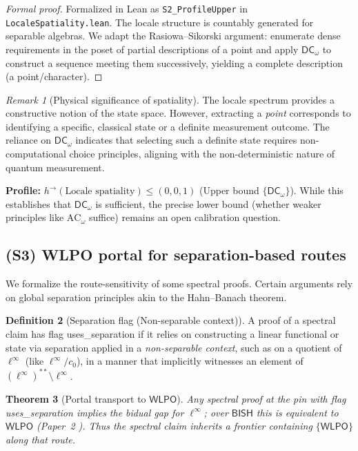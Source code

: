 \documentclass[11pt]{article}
\newcommand{\WLPO}{\mathsf{WLPO}}
\newcommand{\DCw}{\mathsf{DC}_{\omega}}
\newcommand{\lean}[1]{\texttt{#1}}
\newcommand{\leanok}{\text{\tiny [✓ Lean]}}
\theoremstyle{plain}
\newtheorem{theorem}{Theorem}[section]
\theoremstyle{definition}
\newtheorem{definition}[theorem]{Definition}
\theoremstyle{remark}
\newtheorem{remark}[theorem]{Remark}
\newcommand{\linf}{\ell^\infty}
\newcommand{\BISH}{\mathsf{BISH}}
\newcommand{\ACw}{\mathrm{AC}_\omega}
\begin{document}
\begin{proof}[Formal proof]
Formalized in Lean as \lean{S2\_ProfileUpper} in \texttt{LocaleSpatiality.lean}.
The locale structure is countably generated for separable algebras. We adapt the Rasiowa--Sikorski argument: enumerate dense requirements in the poset of partial descriptions of a point and apply $\DCw$ to construct a sequence meeting them successively, yielding a complete description (a point/character).
\end{proof}

\begin{remark}[Physical significance of spatiality]
The locale spectrum provides a constructive notion of the state space. However, extracting a \emph{point} corresponds to identifying a specific, classical state or a definite measurement outcome. The reliance on $\DCw$ indicates that selecting such a definite state requires non-computational choice principles, aligning with the non-deterministic nature of quantum measurement.
\end{remark}

\noindent\textbf{Profile:} $h^{\to}(\text{Locale spatiality})\le (0,0,1)$ (Upper bound $\{\DCw\}$). While this establishes that $\DCw$ is sufficient, the precise lower bound (whether weaker principles like $\ACw$ suffice) remains an open calibration question.

\subsection{(S3) WLPO portal for separation-based routes} \leanok

We formalize the route-sensitivity of some spectral proofs. Certain arguments rely on global separation principles akin to the Hahn--Banach theorem.

\begin{definition}[Separation flag (Non-separable context)]
A proof of a spectral claim has flag \textsf{uses\_separation} if it relies on constructing a linear functional or state via separation applied in a \emph{non-separable context}, such as on a quotient of $\linf$ (like $\linf/c_0$), in a manner that implicitly witnesses an element of $(\linf)^{**}\setminus \linf$.
\end{definition}

\begin{theorem}[Portal transport to $\WLPO$] \leanok
Any spectral proof at the pin with flag \textsf{uses\_separation} implies the bidual gap for $\linf$; over $\BISH$ this is equivalent to $\WLPO$ (Paper~2 \cite{Paper2}). Thus the spectral claim inherits a frontier containing $\{\WLPO\}$ along that route.
\end{theorem}
\end{document}
